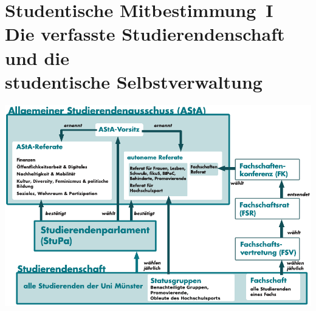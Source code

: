 \section[Studentische Mitbestimmung]{Studentische Mitbestimmung~I\\Die verfasste Studierendenschaft und die \\studentische Selbstverwaltung}
\label{studmit}

\begin{center}
    \includegraphics[width=.83\textwidth]{res/verfasste_studierendenschaft_neu.pdf}
\end{center}

